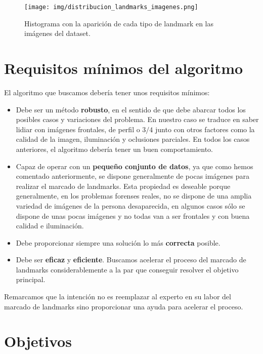             \begin{figure}[H]
                \centering
                \texttt{[image: img/distribucion\_landmarks\_imagenes.png]}
                \caption{Histograma con la aparición de cada tipo de landmark en las imágenes del dataset.}
                \label{fig:Histograma}
            \end{figure}
    

\section{Requisitos mínimos del algoritmo}

\noindent El algoritmo que buscamos debería tener unos requisitos mínimos: 

\begin{itemize}
    \item Debe ser un método \textbf{robusto}, en el sentido de que debe abarcar todos los posibles casos y variaciones del problema. En nuestro caso se traduce en saber lidiar con imágenes frontales, de perfil o $3/4$ junto con otros factores como la calidad de la imagen, iluminación y oclusiones parciales. En todos los casos anteriores, el algoritmo debería tener un buen comportamiento.
    \item Capaz de operar con un \textbf{pequeño conjunto de datos}, ya que como hemos comentado anteriormente, se dispone generalmente de pocas imágenes para realizar el marcado de landmarks. Esta propiedad es deseable porque generalmente, en los problemas forenses reales, no se dispone de una amplia variedad de imágenes de la persona desaparecida, en algunos casos sólo se dispone de unas pocas imágenes y no todas van a ser frontales y con buena calidad e iluminación.

    \item Debe proporcionar siempre una solución lo más \textbf{correcta} posible.  
    
    \item Debe ser \textbf{eficaz} y \textbf{eficiente}. Buscamos acelerar el proceso del marcado de landmarks considerablemente a la par que conseguir resolver el objetivo principal.
\end{itemize}

\noindent Remarcamos que la intención no es reemplazar al experto en su labor del marcado de landmarks sino proporcionar una ayuda para acelerar el proceso.

\section{Objetivos}

